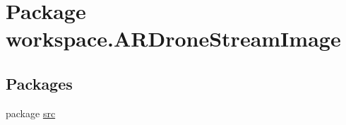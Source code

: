 \hypertarget{namespaceworkspace_1_1_a_r_drone_stream_image}{}\section{Package workspace.\+A\+R\+Drone\+Stream\+Image}
\label{namespaceworkspace_1_1_a_r_drone_stream_image}
\subsection*{Packages}
\begin{DoxyCompactItemize}
\item 
package \hyperlink{namespaceworkspace_1_1_a_r_drone_stream_image_1_1src}{src}
\end{DoxyCompactItemize}
